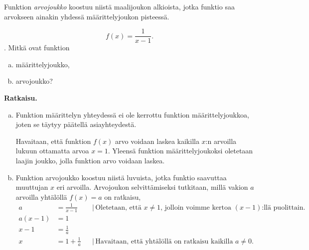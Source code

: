 Funktion \emph{arvojoukko} koostuu niistä maalijoukon alkioista,
jotka funktio saa arvokseen ainakin yhdessä määrittelyjoukon pisteessä.

\[f(x) = \frac{1}{x-1}.\]. Mitkä ovat funktion
\begin{enumerate}[a)]
 \item määrittelyjoukko,
 \item arvojoukko?
\end{enumerate}

\textbf{Ratkaisu.}
\begin{enumerate}[a)]
\item Funktion määrittelyn yhteydessä ei ole kerrottu funktion määrittelyjoukkoa,
joten se täytyy päätellä asiayhteydestä.

Havaitaan, että funktion $f(x)$ arvo voidaan laskea kaikilla $x$:n
arvoilla lukuun ottamatta arvoa $x = 1$. Yleensä funktion määrittelyjoukoksi
oletetaan laajin joukko, jolla funktion arvo voidaan laskea.

\item Funktion arvojoukko koostuu niistä luvuista, jotka funktio
saavuttaa muuttujan $x$ eri arvoilla. Arvojoukon selvittämiseksi
tutkitaan, millä vakion $a$ arvoilla yhtälöllä $f(x) = a$ on
ratkaisu,
\begin{align*}
a &= \frac{1}{x-1} & &| \, \text{Oletetaan, että $x \neq 1$, jolloin voimme kertoa $(x-1)$:llä puolittain.} \\
a(x-1) &= 1 \\
x-1 &= \frac{1}{a} \\
x &= 1+\frac{1}{a} & &| \, \text{Havaitaan, että yhtälöllä on ratkaisu
kaikilla $a \neq 0$.}
\end{align*}
\end{enumerate}

